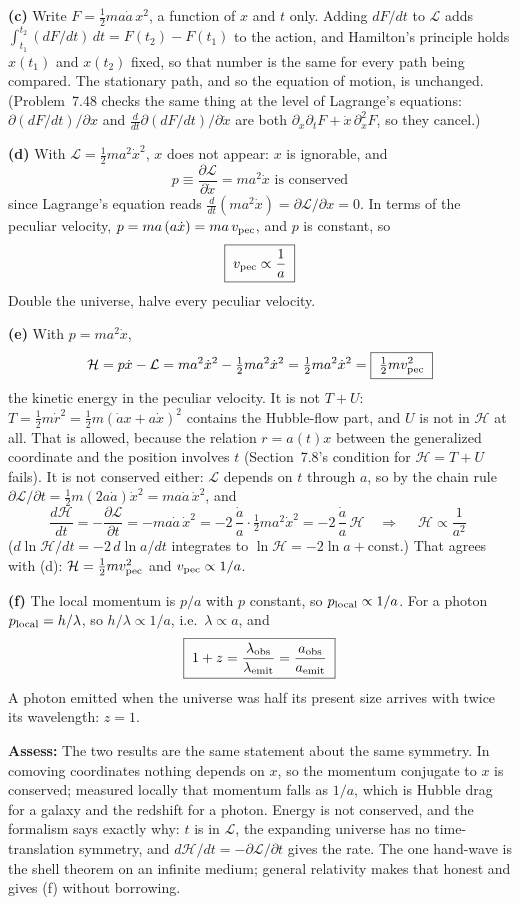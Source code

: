 \documentclass[11pt,letterpaper]{article}
\newcommand{\Lag}{\mathcal{L}}
\newcommand{\Ham}{\mathcal{H}}
\newcommand{\vpec}{v_{\rm pec}}
\newcommand{\pd}[2]{\frac{\partial #1}{\partial #2}}
\begin{document}
\textbf{(c)} Write $F = \tfrac12 m a\dot a\,x^2$, a function of $x$ and $t$ only. Adding $dF/dt$
to $\Lag$ adds $\int_{t_1}^{t_2}(dF/dt)\,dt = F(t_2) - F(t_1)$ to the action, and Hamilton's
principle holds $x(t_1)$ and $x(t_2)$ fixed, so that number is the same for every path being
compared. The stationary path, and so the equation of motion, is unchanged. (Problem~7.48 checks
the same thing at the level of Lagrange's equations: $\partial(dF/dt)/\partial x$ and
$\frac{d}{dt}\partial(dF/dt)/\partial\dot x$ are both $\partial_x\partial_t F + \dot x\,\partial_x^2 F$,
so they cancel.)

\textbf{(d)} With $\Lag = \tfrac12 m a^2\dot x^2$, $x$ does not appear: $x$ is ignorable, and
\[
  \boxed{\; p \equiv \pd{\Lag}{\dot x} = m a^2\dot x \text{ is conserved} \;}
\]
since Lagrange's equation reads $\frac{d}{dt}(m a^2\dot x) = \partial\Lag/\partial x = 0$.
In terms of the peculiar velocity, $p = m a\,(a\dot x) = m a\,\vpec$, and $p$ is constant, so
\[
  \boxed{\;\vpec \propto \frac1a\;}
\]
Double the universe, halve every peculiar velocity.

\textbf{(e)} With $p = m a^2\dot x$,
\[
  \Ham = p\dot x - \Lag = m a^2\dot x^2 - \tfrac12 m a^2\dot x^2 = \tfrac12 m a^2\dot x^2
  = \boxed{\;\tfrac12 m\vpec^2\;}
\]
the kinetic energy in the peculiar velocity. It is not $T + U$: $T = \tfrac12 m\dot r^2 =
\tfrac12 m(\dot a x + a\dot x)^2$ contains the Hubble-flow part, and $U$ is not in $\Ham$ at all.
That is allowed, because the relation $r = a(t)x$ between the generalized coordinate and the
position involves $t$ (Section~7.8's condition for $\Ham = T + U$ fails). It is not conserved
either: $\Lag$ depends on $t$ through $a$, so by the chain rule
$\partial\Lag/\partial t = \tfrac12 m(2a\dot a)\dot x^2 = m a\dot a\,\dot x^2$, and
\[
  \frac{d\Ham}{dt} = -\pd{\Lag}{t} = -m a\dot a\,\dot x^2 = -2\,\frac{\dot a}{a}\cdot\tfrac12 m a^2\dot x^2
  = -2\,\frac{\dot a}{a}\,\Ham
  \quad\Longrightarrow\quad \boxed{\;\Ham \propto \frac1{a^2}\;}
\]
($d\ln\Ham/dt = -2\,d\ln a/dt$ integrates to $\ln\Ham = -2\ln a + \text{const}$.) That agrees
with (d): $\Ham = \tfrac12 m\vpec^2$ and $\vpec \propto 1/a$.

\textbf{(f)} The local momentum is $p/a$ with $p$ constant, so $p_{\rm local} \propto 1/a$. For
a photon $p_{\rm local} = h/\lambda$, so $h/\lambda \propto 1/a$, i.e.\ $\lambda \propto a$, and
\[
  \boxed{\;1 + z = \frac{\lambda_{\rm obs}}{\lambda_{\rm emit}} = \frac{a_{\rm obs}}{a_{\rm emit}}\;}
\]
A photon emitted when the universe was half its present size arrives with twice its wavelength:
$z = 1$.

\textbf{Assess:} The two results are the same statement about the same symmetry. In comoving
coordinates nothing depends on $x$, so the momentum conjugate to $x$ is conserved; measured
locally that momentum falls as $1/a$, which is Hubble drag for a galaxy and the redshift for a
photon. Energy is not conserved, and the formalism says exactly why: $t$ is in $\Lag$, the
expanding universe has no time-translation symmetry, and $d\Ham/dt = -\partial\Lag/\partial t$
gives the rate. The one hand-wave is the shell theorem on an infinite medium; general relativity
makes that honest and gives (f) without borrowing.
\fi
\end{document}
